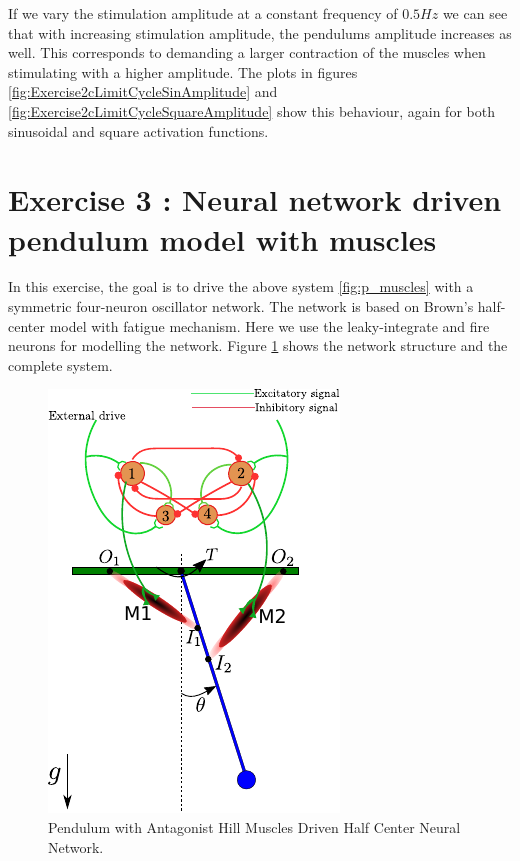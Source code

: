 \documentclass{cmc}
\begin{document}
If we vary the stimulation amplitude at a constant frequency of $0.5 Hz$ we can see that with increasing stimulation amplitude, the pendulums amplitude increases as well. This corresponds to demanding a larger contraction of the muscles when stimulating with a higher amplitude. The plots in figures \ref{fig:Exercise2cLimitCycleSinAmplitude} and \ref{fig:Exercise2cLimitCycleSquareAmplitude} show this behaviour, again for both sinusoidal and square activation functions.


\newpage
\section*{Exercise 3 : Neural network driven pendulum model with
  muscles}
\label{sec:neur-netw-driv}

In this exercise, the goal is to drive the above system
\ref{fig:p_muscles} with a symmetric four-neuron oscillator
network. The network is based on Brown's half-center model with
fatigue mechanism. Here we use the leaky-integrate and fire neurons
for modelling the network. Figure \ref{fig:p_muscles_neurons} shows
the network structure and the complete system.

\begin{figure}[H]
  \centering
  \includegraphics[scale=1.5]{figures/pendulum_muscles_neurons.pdf}
  \caption{Pendulum with Antagonist Hill Muscles Driven Half Center
    Neural Network.}
  \label{fig:p_muscles_neurons}
\end{figure}
\end{document}
